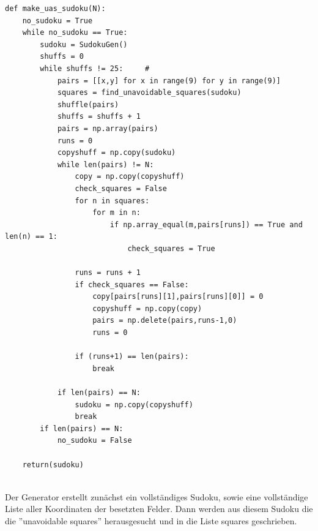 \documentclass[11pt,a4paper]{article}
\begin{document}
\begin{verbatim}   
def make_uas_sudoku(N):
    no_sudoku = True            
    while no_sudoku == True:    
        sudoku = SudokuGen()    
        shuffs = 0              
        while shuffs != 25:     #
            pairs = [[x,y] for x in range(9) for y in range(9)]  
            squares = find_unavoidable_squares(sudoku)           
            shuffle(pairs)                                       
            shuffs = shuffs + 1                                  
            pairs = np.array(pairs)                              
            runs = 0                                             
            copyshuff = np.copy(sudoku)                           
            while len(pairs) != N:                               
                copy = np.copy(copyshuff)                        
                check_squares = False                            
                for n in squares:                                
                    for m in n:                                                    
                        if np.array_equal(m,pairs[runs]) == True and len(n) == 1:  
                            check_squares = True                                   
                
                runs = runs + 1                       
                if check_squares == False:                       
                    copy[pairs[runs][1],pairs[runs][0]] = 0      
                    copyshuff = np.copy(copy)                   
                    pairs = np.delete(pairs,runs-1,0) 
                    runs = 0
                    
                if (runs+1) == len(pairs):                                
                    break                                                 
                                                                          
            if len(pairs) == N:                      
                sudoku = np.copy(copyshuff)          
                break                                
        if len(pairs) == N:                
            no_sudoku = False              
   
    return(sudoku)    
\end{verbatim}
\ \\
Der Generator erstellt zunächst ein vollständiges Sudoku, sowie eine vollständige Liste aller Koordinaten der besetzten Felder. Dann werden aus diesem Sudoku die die ''unavoidable squares'' herausgesucht und in die Liste squares geschrieben.
\end{document}
